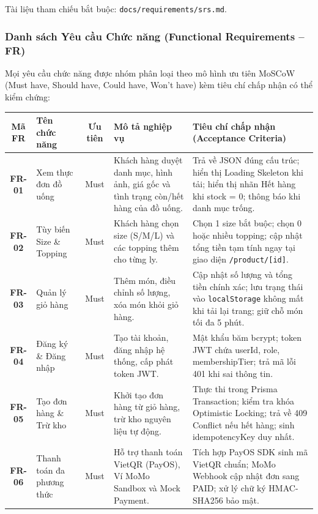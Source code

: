 \documentclass[11pt,a4paper]{article}
\begin{document}
Tài liệu tham chiếu bắt buộc: \texttt{docs/requirements/srs.md}.

\subsubsection{Danh sách Yêu cầu Chức năng (Functional Requirements -- FR)}
Mọi yêu cầu chức năng được nhóm phân loại theo mô hình ưu tiên MoSCoW (Must have, Should have, Could have, Won’t have) kèm tiêu chí chấp nhận có thể kiểm chứng:

\begin{table}[H]
\centering
\small
\renewcommand{\arraystretch}{0.88}
\begin{tabularx}{\linewidth}{|c|p{2.6cm}|c|p{4.2cm}|Y|}
\hline
{}
\textbf{Mã FR} & \textbf{Tên chức năng} & \textbf{Ưu tiên} & \textbf{Mô tả nghiệp vụ} & \textbf{Tiêu chí chấp nhận (Acceptance Criteria)} \\ \hline
\textbf{FR-01} & Xem thực đơn đồ uống & Must & Khách hàng duyệt danh mục, hình ảnh, giá gốc và tình trạng còn/hết hàng của đồ uống. & Trả về JSON đúng cấu trúc; hiển thị Loading Skeleton khi tải; hiển thị nhãn Hết hàng khi stock = 0; thông báo khi danh mục trống. \\ \hline
\textbf{FR-02} & Tùy biến Size \& Topping & Must & Khách hàng chọn size (S/M/L) và các topping thêm cho từng ly. & Chọn 1 size bắt buộc; chọn 0 hoặc nhiều topping; cập nhật tổng tiền tạm tính ngay tại giao diện \texttt{/product/[id]}. \\ \hline
\textbf{FR-03} & Quản lý giỏ hàng & Must & Thêm món, điều chỉnh số lượng, xóa món khỏi giỏ hàng. & Cập nhật số lượng và tổng tiền chính xác; lưu trạng thái vào \texttt{localStorage} không mất khi tải lại trang; giữ chỗ món tối đa 5 phút. \\ \hline
\textbf{FR-04} & Đăng ký \& Đăng nhập & Must & Tạo tài khoản, đăng nhập hệ thống, cấp phát token JWT. & Mật khẩu băm bcrypt; token JWT chứa userId, role, membershipTier; trả mã lỗi 401 khi sai thông tin. \\ \hline
\textbf{FR-05} & Tạo đơn hàng \& Trừ kho & Must & Khởi tạo đơn hàng từ giỏ hàng, trừ kho nguyên liệu tự động. & Thực thi trong Prisma Transaction; kiểm tra khóa Optimistic Locking; trả về 409 Conflict nếu hết hàng; sinh idempotencyKey duy nhất. \\ \hline
\textbf{FR-06} & Thanh toán đa phương thức & Must & Hỗ trợ thanh toán VietQR (PayOS), Ví MoMo Sandbox và Mock Payment. & Tích hợp PayOS SDK sinh mã VietQR chuẩn; MoMo Webhook cập nhật đơn sang PAID; xử lý chữ ký HMAC-SHA256 bảo mật. \\ \hline

\end{tabularx}
\end{table}
\end{document}

